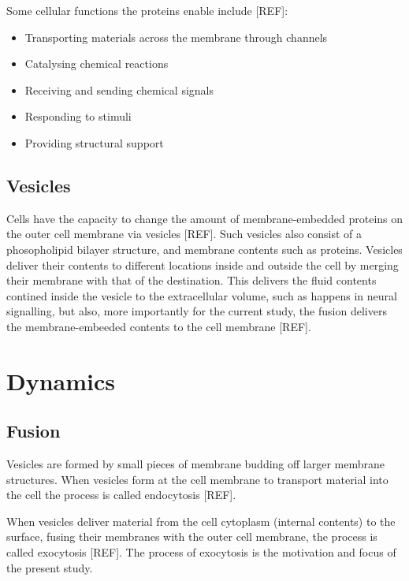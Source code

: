 \documentclass{report}
\begin{document}
Some cellular functions the proteins enable include [REF]:
\begin{itemize}
	\item Transporting materials across the membrane through channels
	\item Catalysing chemical reactions
	\item Receiving and sending chemical signals
	\item Responding to stimuli
	\item Providing structural support
\end{itemize}

\section{Vesicles}
Cells have the capacity to change the amount of membrane-embedded proteins on the outer cell membrane via vesicles [REF]. Such vesicles also consist of a phosopholipid bilayer structure, and membrane contents such as proteins. Vesicles deliver their contents to different locations inside and outside the cell by merging their membrane with that of the destination. This delivers the fluid contents contined inside the vesicle to the extracellular volume, such as happens in neural signalling, but also, more importantly for the current study, the fusion delivers the membrane-embeeded contents to the cell membrane [REF].

\chapter{Dynamics}
\section{Fusion}
Vesicles are formed by small pieces of membrane budding off larger membrane structures. When vesicles form at the cell membrane to transport material into the cell the process is called endocytosis [REF].

When vesicles deliver material from the cell cytoplasm (internal contents) to the surface, fusing their membranes with the outer cell membrane, the process is called exocytosis [REF]. The process of exocytosis is the motivation and focus of the present study.
\end{document}
